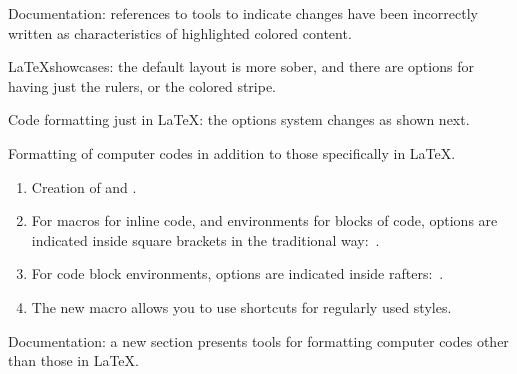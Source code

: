 \documentclass{tutodoc}
\begin{document}
\small

\begin{tdocfix}
	\item Documentation: references to tools to indicate changes have been incorrectly written as characteristics of highlighted colored content.
\end{tdocfix}


\begin{tdocbreak}
	\item \LaTeX showcases: the default layout is more sober, and there are options for having just the rulers, or the colored stripe.

	\item Code formatting just in \LaTeX: the options system changes as shown next.
\end{tdocbreak}


\begin{tdocnew}
	\item Formatting of computer codes in addition to those specifically in LaTeX.
	\begin{enumerate}
		\item Creation of  and .

		\item For macros for inline code, and environments for blocks of code,  options are indicated inside square brackets in the traditional way: \,.

		\item For code block environments,  options are indicated inside rafters: \,.

		\item The new macro  allows you to use shortcuts for regularly used  styles.
	\end{enumerate}

	\item Documentation: a new section presents tools for formatting computer codes other than those in LaTeX.
\end{tdocnew}
\end{document}
